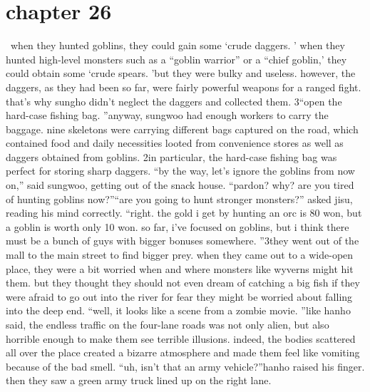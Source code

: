 \section{chapter 26}






 when they hunted goblins, they could gain some ‘crude daggers.
’ when they hunted high-level monsters such as a “goblin warrior” or a “chief goblin,’ they could obtain some ‘crude spears.
’but they were bulky and useless.
however, the daggers, as they had been so far, were fairly powerful weapons for a ranged fight.
 that’s why sungho didn’t neglect the daggers and collected them.
3“open the hard-case fishing bag.
”anyway, sungwoo had enough workers to carry the baggage.
 nine skeletons were carrying different bags captured on the road, which contained food and daily necessities looted from convenience stores as well as daggers obtained from goblins.
2in particular, the hard-case fishing bag was perfect for storing sharp daggers.
“by the way, let’s ignore the goblins from now on,” said sungwoo, getting out of the snack house.
“pardon? why? are you tired of hunting goblins now?”“are you going to hunt stronger monsters?” asked jisu, reading his mind correctly.
“right.
 the gold i get by hunting an orc is 80 won, but a goblin is worth only 10 won.
 so far, i’ve focused on goblins, but i think there must be a bunch of guys with bigger bonuses somewhere.
”3they went out of the mall to the main street to find bigger prey.
when they came out to a wide-open place, they were a bit worried when and where monsters like wyverns might hit them.
 but they thought they should not even dream of catching a big fish if they were afraid to go out into the river for fear they might be worried about falling into the deep end.
“well, it looks like a scene from a zombie movie.
”like hanho said, the endless traffic on the four-lane roads was not only alien, but also horrible enough to make them see terrible illusions.
 indeed, the bodies scattered all over the place created a bizarre atmosphere and made them feel like vomiting because of the bad smell.
“uh, isn’t that an army vehicle?”hanho raised his finger.
 then they saw a green army truck lined up on the right lane.

